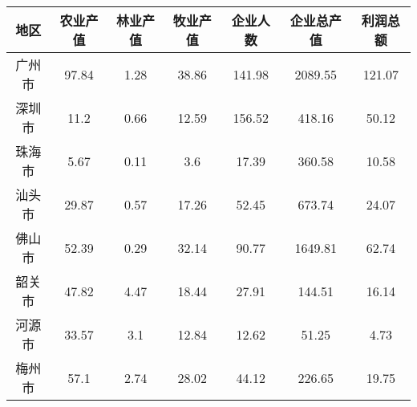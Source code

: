 \documentclass{standalone}
\begin{document}
	\begin{tabular}{c|cccccc}
		\toprule
		 地区  & 农业产值 & 林业产值 & 牧业产值 & 企业人数 & 企业总产值 & 利润总额 \\
		\midrule
		广州市 & 97.84 & 1.28 & 38.86 & 141.98 & 2089.55 & 121.07 \\
		深圳市 & 11.2 & 0.66 & 12.59 & 156.52 & 418.16 & 50.12 \\
		珠海市 & 5.67 & 0.11 & 3.6 & 17.39 & 360.58 & 10.58 \\
		汕头市 & 29.87 & 0.57 & 17.26 & 52.45 & 673.74 & 24.07 \\
		佛山市 & 52.39 & 0.29 & 32.14 & 90.77 & 1649.81 & 62.74 \\
		韶关市 & 47.82 & 4.47 & 18.44 & 27.91 & 144.51 & 16.14 \\
		河源市 & 33.57 & 3.1 & 12.84 & 12.62 & 51.25 & 4.73 \\
		梅州市 & 57.1 & 2.74 & 28.02 & 44.12 & 226.65 & 19.75 \\
		\bottomrule
	\end{tabular}
\end{document}
